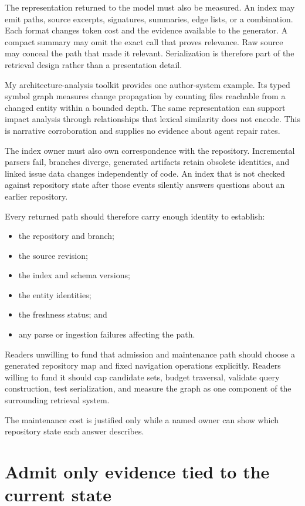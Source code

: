 The representation returned to the model must also be measured. An index may emit paths, source excerpts, signatures, summaries, edge lists, or a combination. Each format changes token cost and the evidence available to the generator. A compact summary may omit the exact call that proves relevance. Raw source may conceal the path that made it relevant. Serialization is therefore part of the retrieval design rather than a presentation detail.

My architecture-analysis toolkit provides one author-system example. Its typed symbol graph measures change propagation by counting files reachable from a changed entity within a bounded depth. The same representation can support impact analysis through relationships that lexical similarity does not encode. This is narrative corroboration and supplies no evidence about agent repair rates.

The index owner must also own correspondence with the repository. Incremental parsers fail, branches diverge, generated artifacts retain obsolete identities, and linked issue data changes independently of code. An index that is not checked against repository state after those events silently answers questions about an earlier repository.

Every returned path should therefore carry enough identity to establish:

\begin{itemize}
\tightlist
\item
  the repository and branch;
\item
  the source revision;
\item
  the index and schema versions;
\item
  the entity identities;
\item
  the freshness status; and
\item
  any parse or ingestion failures affecting the path.
\end{itemize}

Readers unwilling to fund that admission and maintenance path should choose a generated repository map and fixed navigation operations explicitly. Readers willing to fund it should cap candidate sets, budget traversal, validate query construction, test serialization, and measure the graph as one component of the surrounding retrieval system.

The maintenance cost is justified only while a named owner can show which repository state each answer describes.

\section{Admit only evidence tied to the current state}\label{admit-only-evidence-tied-to-the-current-state}

